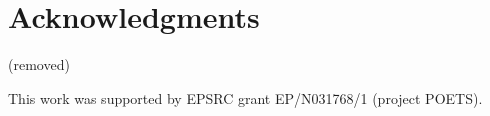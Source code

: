 \section*{Acknowledgments}

\ifdefined \blindreview

	(removed)

\else

	This work was supported by EPSRC grant EP/N031768/1 (project POETS).

\fi
